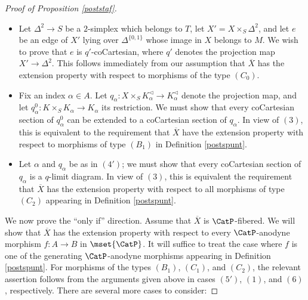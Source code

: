 \begin{proof}[Proof of Proposition \ref{poststaf}]
\begin{itemize}
We now treat the general case where $\overline{e}$ is not assumed to be degenerate.
Using the extension property with respect to morphisms of type $(B_0)$, we can choose
an edge $e': x \rightarrow y'$ in $M'$ which lies over $\overline{e}$.
Since $e'$ is $q'$-coCartesian, we can choose a $2$-simplex
$$ \xymatrix{ & y' \ar[dr]^{e''} & \\
x \ar[ur]^{e'} \ar[rr]^{e} & & y }$$
lying over the edge $\overline{e}$ in $S'$, where $e''$ is an edge of the fiber $X'_{q'(y)}$. Since $e$ is also $q'$-coCartesian, we
deduce that $e''$ is an equivalence in $X'_{q'(y)}$, so that $e'' \in M$ by the above argument.
Invoking our assumption that $\overline{X}$ has the extension property with respect
to morphisms of the type $(A_0)$, we deduce that $e \in M'$, as desired.

\item[$(4)$] Let $\Delta^2 \rightarrow S$ be a $2$-simplex which belongs to $T$, let
$X' = X \times_{S} \Delta^2$, and let $e$ be an edge of $X'$ lying over
$\Delta^{ \{0,1\} }$ whose image in $X$ belongs to $M$. We wish to prove that
$e$ is $q'$-coCartesian, where $q'$ denotes the projection map
$X' \rightarrow \Delta^2$. This follows immediately from our assumption that
$\overline{X}$ has the extension property with respect to morphisms of the type
$(C_0)$.

\item[$(5')$] Fix an index $\alpha \in A$. Let $q_{\alpha}: X \times_{S} K_{\alpha}^{\triangleleft} \rightarrow K_{\alpha}^{\triangleleft}$ denote the projection map, and let
$q_{\alpha}^{0}: K \times_{S} K_{\alpha} \rightarrow K_{\alpha}$ its restriction.
We must show that every coCartesian section of $q_{\alpha}^{0}$ can be extended to
a coCartesian section of $q_{\alpha}$. In view of $(3)$, this is equivalent to the requirement
that $\overline{X}$ have the extension property with respect to morphisms of type $(B_1)$ in
Definition \ref{postspunt}.

\item[$(6)$] Let $\alpha$ and $q_{\alpha}$ be as in $(4')$; we must show that every
coCartesian section of $q_{\alpha}$ is a $q$-limit diagram. In view of $(3)$, this is equivalent
the requirement that $\overline{X}$ has the extension property with respect to all morphisms
of type $(C_2)$ appearing in Definition \ref{postspunt}.
\end{itemize}

We now prove the ``only if'' direction. Assume that $\overline{X}$ is $\CatP$-fibered.
We will show that $\overline{X}$ has the extension property with respect to every
$\CatP$-anodyne morphism $f: A \rightarrow B$ in $\mset{ \CatP}$. It will suffice to
treat the case where $f$ is one of the generating $\CatP$-anodyne morphisms
appearing in Definition \ref{postspunt}. For morphisms of the types
$(B_1)$, $(C_1)$, and $(C_2)$, the relevant assertion follows from the arguments given above
in cases $(5')$, $(1)$, and $(6)$, respectively. There are several more cases to consider:


\end{proof}
